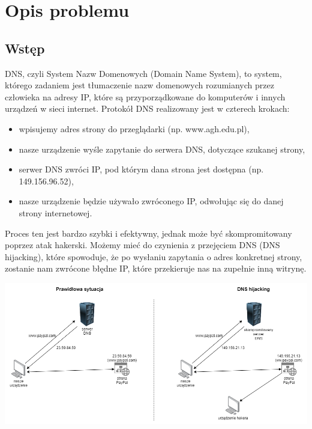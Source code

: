 \section{Opis problemu}

\subsection{Wstęp}

\hspace{0.5cm} DNS, czyli System Nazw Domenowych (Domain Name System), to system, którego zadaniem jest tłumaczenie nazw domenowych rozumianych przez człowieka na adresy IP, które są przyporządkowane do komputerów i innych urządzeń w sieci internet. Protokół DNS realizowany jest w czterech krokach:

\begin{itemize}
\item wpisujemy adres strony do przeglądarki (np. www.agh.edu.pl),
\item nasze urządzenie wyśle zapytanie do serwera DNS, dotyczące szukanej strony,
\item serwer DNS zwróci IP, pod którym dana strona jest dostępna (np. 149.156.96.52),
\item nasze urządzenie będzie używało zwróconego IP, odwołując się do danej strony internetowej.
\end{itemize}


Proces ten jest bardzo szybki i efektywny, jednak może być skompromitowany poprzez atak hakerski. Możemy mieć do czynienia z przejęciem DNS (DNS hijacking), które spowoduje, że po wysłaniu zapytania o adres konkretnej strony, zostanie nam zwrócone błędne IP, które przekieruje nas na zupełnie inną witrynę. 

\vspace{0.5cm}
\includegraphics[scale=0.4]{hijackingDNS.png}
\vspace{0.5cm}
 
